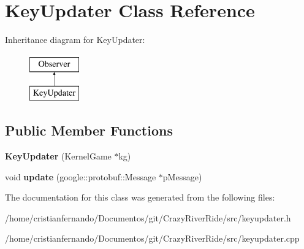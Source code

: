 \hypertarget{class_key_updater}{\section{Key\-Updater Class Reference}
\label{class_key_updater}
}
Inheritance diagram for Key\-Updater\-:\begin{figure}[H]
\begin{center}
\leavevmode
\includegraphics[height=2.000000cm]{class_key_updater}
\end{center}
\end{figure}
\subsection*{Public Member Functions}
\begin{DoxyCompactItemize}
\item 
\hypertarget{class_key_updater_a9e36344e5b6ea74cd35d64b00b108a18}{{\bfseries Key\-Updater} (Kernel\-Game $\ast$kg)}\label{class_key_updater_a9e36344e5b6ea74cd35d64b00b108a18}

\item 
\hypertarget{class_key_updater_ae98e44fb4a0be038fd6482bfae40007e}{void {\bfseries update} (google\-::protobuf\-::\-Message $\ast$p\-Message)}\label{class_key_updater_ae98e44fb4a0be038fd6482bfae40007e}

\end{DoxyCompactItemize}


The documentation for this class was generated from the following files\-:\begin{DoxyCompactItemize}
\item 
/home/cristianfernando/\-Documentos/git/\-Crazy\-River\-Ride/src/keyupdater.\-h\item 
/home/cristianfernando/\-Documentos/git/\-Crazy\-River\-Ride/src/keyupdater.\-cpp\end{DoxyCompactItemize}
